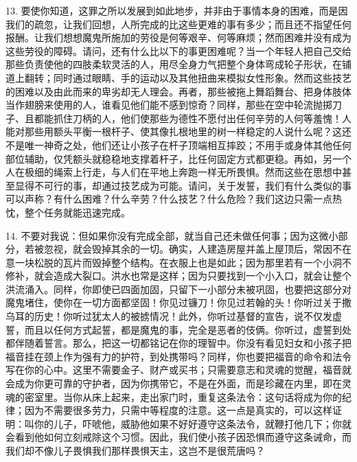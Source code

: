 13. 要使你知道，这罪之所以发展到如此地步，并非由于事情本身的困难，而是因我们的疏忽，让我们回想，人所完成的比这些更难的事有多少；而且还不指望任何报酬。让我们想想魔鬼所施加的劳役是何等艰辛、何等麻烦；然而困难并没有成为这些劳役的障碍。请问，还有什么比以下的事更困难呢？当一个年轻人把自己交给那些负责使他的四肢柔软灵活的人，用尽全身力气把整个身体弯成轮子形状，在铺道上翻转；同时通过眼睛、手的运动以及其他扭曲来模拟女性形象。然而这些技艺的困难以及由此而来的卑劣却无人理会。再者，那些被拖上舞蹈舞台、把身体肢体当作翅膀来使用的人，谁看见他们能不感到惊奇？同样，那些在空中轮流抛掷刀子、且都能抓住刀柄的人，他们使那些为德性不愿付出任何辛劳的人何等羞愧！人能对那些用额头平衡一根杆子、使其像扎根地里的树一样稳定的人说什么呢？这还不是唯一神奇之处，他们还让小孩子在杆子顶端相互摔跤；不用手或身体其他任何部位辅助，仅凭额头就稳稳地支撑着杆子，比任何固定方式都更稳。再如，另一个人在极细的绳索上行走，与人们在平地上奔跑一样无所畏惧。然而这些在思想中甚至显得不可行的事，却通过技艺成为可能。请问，关于发誓，我们有什么类似的事可以声称？有什么困难？什么辛劳？什么技艺？什么危险？我们这边只需一点热忱，整个任务就能迅速完成。\par

14. 不要对我说：但如果你没有完成全部，就当自己还未做任何事；因为这微小部分，若被忽视，就会毁掉其余的一切。确实，人建造房屋并盖上屋顶后，常因不在意一块松脱的瓦片而毁掉整个结构。在衣服上也是如此；因为那里若有一个小洞不修补，就会造成大裂口。洪水也常是这样；因为只要找到一个小入口，就会让整个洪流涌入。同样，你即使已四面加固，只留下一小部分未被巩固，也要把这部分对魔鬼堵住，使你在一切方面都坚固！你见过镰刀！你见过若翰的头！你听过关于撒乌耳的历史！你听过犹太人的被掳情况！此外，你听过基督的宣告，说不仅发虚誓，而且以任何方式起誓，都是魔鬼的事，完全是恶者的伎俩。你听过，虚誓到处都伴随着誓言。那么，把这一切都铭记在你的理智中。你没有看见妇女和小孩子把福音挂在颈上作为强有力的护符，到处携带吗？同样，你也要把福音的命令和法令写在你的心中。这里不需要金子、财产或买书；只需要意志和灵魂的觉醒，福音就会成为你更可靠的守护者，因为你携带它，不是在外面，而是珍藏在内里，即在灵魂的密室里。当你从床上起来，走出家门时，重复这条法令：这句话将成为你的纪律；因为不需要很多劳力，只需中等程度的注意。这一点是真实的，可以这样证明：叫你的儿子，吓唬他，威胁他如果不好好遵守这条法令，就鞭打他几下；你就会看到他如何立刻戒除这个习惯。因此，我们使小孩子因恐惧而遵守这条诫命，而我们却不像儿子畏惧我们那样畏惧天主，这岂不是很荒唐吗？\par

